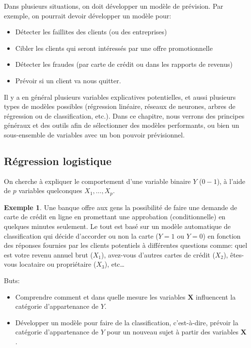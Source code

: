 \documentclass[
  11pt,
  letterpaper,
]{book}
\providecommand{\tightlist}{%
  \setlength{\itemsep}{0pt}\setlength{\parskip}{0pt}}
\theoremstyle{definition}
\theoremstyle{definition}
\newtheorem{example}{Exemple}[chapter]
\theoremstyle{definition}
\theoremstyle{remark}
\begin{document}
Dans plusieurs situations, on doit développer un modèle de prévision. Par exemple, on pourrait devoir développer un modèle pour:

\begin{itemize}
\tightlist
\item
  Détecter les faillites des clients (ou des entreprises)
\item
  Cibler les clients qui seront intéressés par une offre promotionnelle
\item
  Détecter les fraudes (par carte de crédit ou dans les rapports de revenus)
\item
  Prévoir si un client va nous quitter.
\end{itemize}

Il y a en général plusieurs variables explicatives potentielles, et aussi plusieurs types de modèles possibles (régression linéaire, réseaux de neurones, arbres de régression ou de classification, etc.). Dans ce chapitre, nous verrons des principes généraux et des outils afin de sélectionner des modèles performants, ou bien un sous-ensemble de variables avec un bon pouvoir prévisionnel.

\hypertarget{ruxe9gression-logistique}{%
\subsection{Régression logistique}\label{ruxe9gression-logistique}}

On cherche à expliquer le comportement d'une variable binaire \(Y\) (\(0-1\)), à l'aide de \(p\) variables quelconques \(X_1, \ldots, X_p\).

\begin{example}
\protect\hypertarget{exm:unnamed-chunk-3}{}{\label{exm:unnamed-chunk-3} }Une banque offre aux gens la possibilité de faire une demande de carte de crédit en ligne en promettant une approbation (conditionnelle) en quelques minutes seulement. Le tout est basé sur un modèle automatique de classification qui décide d'accorder ou non la carte (\(Y=1\) ou \(Y=0\)) en fonction des réponses fournies par les clients potentiels à différentes questions comme: quel est votre revenu annuel brut (\(X_1\)), avez-vous d'autres cartes de crédit (\(X_2\)), êtes-vous locataire ou propriétaire (\(X_3\)), etc\ldots
\end{example}

Buts:

\begin{itemize}
\tightlist
\item
  Comprendre comment et dans quelle mesure les variables \(\boldsymbol{X}\) influencent la catégorie d'appartenance de \(Y\).
\item
  Développer un modèle pour faire de la classification, c'est-à-dire, prévoir la catégorie d'appartenance de \(Y\) pour un nouveau sujet à partir des variables \(\boldsymbol{X}\).
\end{itemize}
\end{document}
